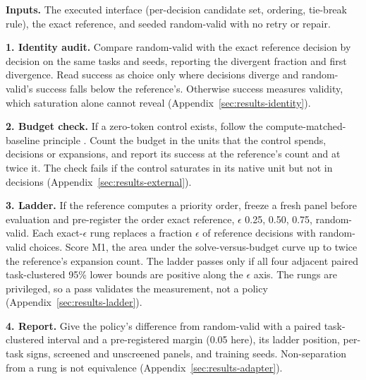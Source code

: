 \begin{protocolbox}[!t]
\caption{Validate before score. Four steps admit random-valid as a choice control and validate the success measure before any policy is scored.}
\label{box:procedure}
\begin{tcolorbox}[
  title={Four-step validation},
  colbacktitle=black!60,
  coltitle=white,
  colback=black!3,
  colframe=black!60,
  fonttitle=\bfseries,
  fontupper=\small,
  boxrule=0.5pt,
  boxsep=5pt]
\textbf{Inputs.} The executed interface (per-decision candidate set, ordering, tie-break rule), the exact reference, and seeded random-valid with no retry or repair.

\smallskip
\textbf{1. Identity audit.} Compare random-valid with the exact reference decision by decision on the same tasks and seeds, reporting the divergent fraction and first divergence. Read success as choice only where decisions diverge and random-valid's success falls below the reference's. Otherwise success measures validity, which saturation alone cannot reveal (Appendix~\ref{sec:results-identity}).

\smallskip
\textbf{2. Budget check.} If a zero-token control exists, follow the compute-matched-baseline principle \citep{li2019random}. Count the budget in the units that the control spends, decisions or expansions, and report its success at the reference's count and at twice it. The check fails if the control saturates in its native unit but not in decisions (Appendix~\ref{sec:results-external}).

\smallskip
\textbf{3. Ladder.} If the reference computes a priority order, freeze a fresh panel before evaluation and pre-register the order exact reference, $\epsilon$ 0.25, 0.50, 0.75, random-valid. Each exact-$\epsilon$ rung replaces a fraction $\epsilon$ of reference decisions with random-valid choices. Score M1, the area under the solve-versus-budget curve up to twice the reference's expansion count. The ladder passes only if all four adjacent paired task-clustered 95\% lower bounds are positive along the $\epsilon$ axis. The rungs are privileged, so a pass validates the measurement, not a policy (Appendix~\ref{sec:results-ladder}).

\smallskip
\textbf{4. Report.} Give the policy's difference from random-valid with a paired task-clustered interval and a pre-registered margin (0.05 here), its ladder position, per-task signs, screened and unscreened panels, and training seeds. Non-separation from a rung is not equivalence (Appendix~\ref{sec:results-adapter}).


\end{tcolorbox}
\end{protocolbox}
